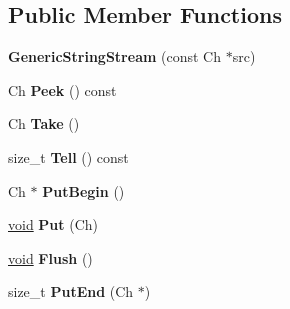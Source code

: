 \subsection*{Public Member Functions}
\begin{DoxyCompactItemize}
\item 
\hypertarget{struct_generic_string_stream_a6b20885ed64e33f5d081a1e83b07da06}{}{\bfseries Generic\+String\+Stream} (const Ch $\ast$src)\label{struct_generic_string_stream_a6b20885ed64e33f5d081a1e83b07da06}

\item 
\hypertarget{struct_generic_string_stream_a87d794a70cf132f32521fb2b145ba58d}{}Ch {\bfseries Peek} () const \label{struct_generic_string_stream_a87d794a70cf132f32521fb2b145ba58d}

\item 
\hypertarget{struct_generic_string_stream_a0d26e3e77e4fca64a87c2d71f48ac5e5}{}Ch {\bfseries Take} ()\label{struct_generic_string_stream_a0d26e3e77e4fca64a87c2d71f48ac5e5}

\item 
\hypertarget{struct_generic_string_stream_a71dde3ded678912be1ef56376a72a653}{}size\+\_\+t {\bfseries Tell} () const \label{struct_generic_string_stream_a71dde3ded678912be1ef56376a72a653}

\item 
\hypertarget{struct_generic_string_stream_a88c908b4dac9773240ce4bca4b6dd837}{}Ch $\ast$ {\bfseries Put\+Begin} ()\label{struct_generic_string_stream_a88c908b4dac9773240ce4bca4b6dd837}

\item 
\hypertarget{struct_generic_string_stream_aaa59dc5313151a4125bf7840f87a33eb}{}\hyperlink{_s_d_l__audio_8h_a52835ae37c4bb905b903cbaf5d04b05f}{void} {\bfseries Put} (Ch)\label{struct_generic_string_stream_aaa59dc5313151a4125bf7840f87a33eb}

\item 
\hypertarget{struct_generic_string_stream_a5ff1a870d9334cd054cf4ca34c86ddc3}{}\hyperlink{_s_d_l__audio_8h_a52835ae37c4bb905b903cbaf5d04b05f}{void} {\bfseries Flush} ()\label{struct_generic_string_stream_a5ff1a870d9334cd054cf4ca34c86ddc3}

\item 
\hypertarget{struct_generic_string_stream_a07b942bacda494afb3b2f7629cef14af}{}size\+\_\+t {\bfseries Put\+End} (Ch $\ast$)\label{struct_generic_string_stream_a07b942bacda494afb3b2f7629cef14af}

\end{DoxyCompactItemize}
